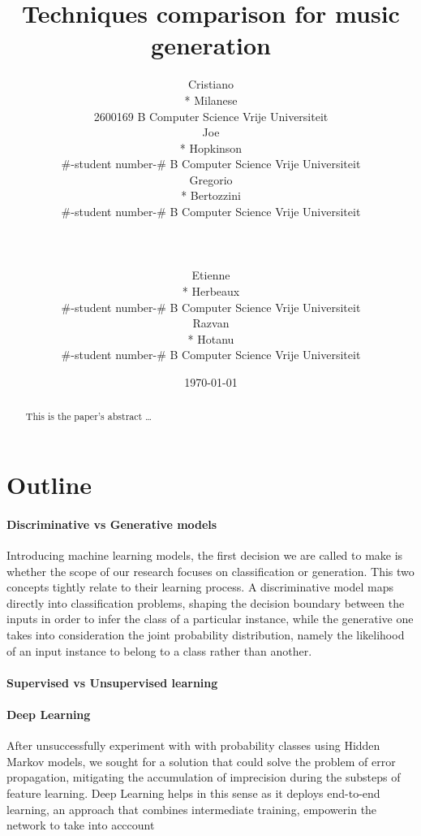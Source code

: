 \documentclass[12pt]{article}
\title{\Huge Techniques comparison for music generation}
\author{
  \fontsize{10}{12px}\selectfont
    \begin{minipage}[c]{0.33\textwidth}
      \section*{\small Cristiano \\* Milanese}
      2600169\newline
      B Computer Science\newline
      Vrije Universiteit
    \end{minipage}
    \begin{minipage}[c]{0.33\textwidth}
      \section*{\small Joe \\* Hopkinson}
      \#-student number-\#\newline
      B Computer Science\newline
      Vrije Universiteit
    \end{minipage}
    \begin{minipage}[c]{0.33\textwidth}
      \section*{\small Gregorio \\* Bertozzini}
      \#-student number-\#\newline
      B Computer Science\newline
      Vrije Universiteit
    \end{minipage}
    \\
    \\
    \fontsize{10}{12px}\selectfont
    \begin{minipage}[c]{0.5\textwidth}
      \section*{\small Etienne \\* Herbeaux}
      \#-student number-\#\newline
      B Computer Science\newline
      Vrije Universiteit
    \end{minipage}
    \begin{minipage}[c]{0.33\textwidth}
      \section*{\small Razvan \\* Hotanu}
      \#-student number-\#\newline
      B Computer Science\newline
      Vrije Universiteit
    \end{minipage}
}
\date{\today}
\begin{document}
\maketitle
\vspace{100px}
\pagebreak

\begin{abstract}
This is the paper's abstract \ldots
\end{abstract}

\section*{Outline}
\paragraph{Discriminative vs Generative models}
  Introducing machine learning models, the first decision we are called to make is whether
  the scope of our research focuses on classification or generation. This two concepts tightly
  relate to their learning process. A discriminative model maps directly into classification problems, shaping the decision boundary between the inputs in order to
  infer the class of a particular instance, while the generative one takes into consideration the joint probability distribution, namely the likelihood of an input instance to belong to a class rather than another.
\paragraph{Supervised vs Unsupervised learning}

\paragraph{Deep Learning}
  After unsuccessfully experiment with with probability classes using Hidden Markov models, we sought for a solution that could solve the problem of error propagation, mitigating the accumulation of imprecision during the substeps of feature learning. Deep Learning helps in this sense as it deploys end-to-end learning, an approach that combines intermediate training, empowerin the network to take into acccount
\end{document}
